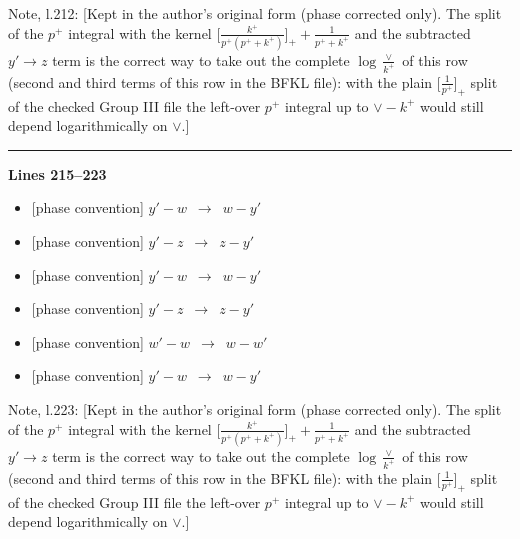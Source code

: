 \documentclass[10pt]{article}
\newenvironment{notebox}{\def\FrameCommand{{\color{notebar}\vrule width 1.5pt}\hspace{6pt}}\MakeFramed{\advance\hsize-\width\FrameRestore}\small}{\endMakeFramed}
\begin{document}
\begin{notebox}\textsf{\small Note, l.212:} [Kept in the author's original form (phase corrected only). The split of the $p^{+}$ integral with the kernel $\big[\frac{k^{+}}{p^{+}(p^{+}+k^{+})}\big]_{+}+\frac{1}{p^{+}+k^{+}}$ and the subtracted $y'\to z$ term is the correct way to take out the complete $\log\frac{\vee}{k^{+}}$ of this row (second and third terms of this row in the BFKL file): with the plain $\big[\frac{1}{p^{+}}\big]_{+}$ split of the checked Group III file the left-over $p^{+}$ integral up to $\vee-k^{+}$ would still depend logarithmically on $\vee$.]\end{notebox}
\noindent\rule{\linewidth}{0.3pt}\par\noindent\textbf{Lines 215--223} \par
\begin{itemize}[leftmargin=2.2em,itemsep=1pt,topsep=2pt]
\item[\textbf{l.215}] \textsf{\small [phase convention]} $\displaystyle y'-w$\ $\longrightarrow$\ $\displaystyle w-y'$
\item[\textbf{l.215}] \textsf{\small [phase convention]} $\displaystyle y'-z$\ $\longrightarrow$\ $\displaystyle z-y'$
\item[\textbf{l.216}] \textsf{\small [phase convention]} $\displaystyle y'-w$\ $\longrightarrow$\ $\displaystyle w-y'$
\item[\textbf{l.216}] \textsf{\small [phase convention]} $\displaystyle y'-z$\ $\longrightarrow$\ $\displaystyle z-y'$
\item[\textbf{l.219}] \textsf{\small [phase convention]} $\displaystyle w'-w$\ $\longrightarrow$\ $\displaystyle w-w'$
\item[\textbf{l.221}] \textsf{\small [phase convention]} $\displaystyle y'-w$\ $\longrightarrow$\ $\displaystyle w-y'$
\end{itemize}
\begin{notebox}\textsf{\small Note, l.223:} [Kept in the author's original form (phase corrected only). The split of the $p^{+}$ integral with the kernel $\big[\frac{k^{+}}{p^{+}(p^{+}+k^{+})}\big]_{+}+\frac{1}{p^{+}+k^{+}}$ and the subtracted $y'\to z$ term is the correct way to take out the complete $\log\frac{\vee}{k^{+}}$ of this row (second and third terms of this row in the BFKL file): with the plain $\big[\frac{1}{p^{+}}\big]_{+}$ split of the checked Group III file the left-over $p^{+}$ integral up to $\vee-k^{+}$ would still depend logarithmically on $\vee$.]\end{notebox}
\end{document}
